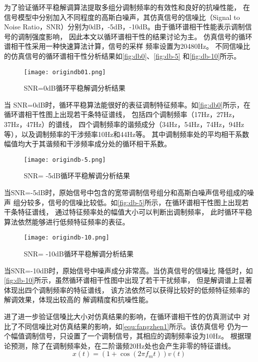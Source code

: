 为了验证循环平稳解调算法提取多组分调制频率的有效性和良好的抗噪性能，
在信号模型中分别加入不同程度的高斯白噪声，其仿真信号的信噪比（Signal to Noise 
Ratio，SNR）分别为0dB，-5dB，-10dB。由于循环谱相干性能表示调制信号的调制强度影响，
因此本文以循环谱相干性的结果讨论为主。
仿真信号的循环谱相干性采用一种快速算法计算，信号的采样
频率设置为20480Hz。
不同信噪比的仿真信号的循环谱相干性分析结果如\autoref{fig:db0}、\autoref{fig:db-5}
和\autoref{fig:db-10}所示。
\begin{figure}[htbp]
    \centering
    \texttt{[image: origindb01.png]}
    \caption{\label{fig:db0}SNR=0dB循环平稳解调分析结果}
\end{figure}

当 SNR=0dB时，循环平稳算法能很好的表征调制特征频率。如\autoref{fig:db0}所示，在循环谱相干性图上出现若干条特征谱线，
包括四个调制频率（17Hz，27Hz，37Hz，47Hz）的谱线，
四个调制频率的谐频成分（34Hz，54Hz，74Hz，94Hz等），以及调制频率的干涉频率10Hz和44Hz等。
其中调制频率处的平均相干系数幅值均大于其谐频和干涉频率成分处的循环相干系数。
\begin{figure}[htbp]
    \centering
    \texttt{[image: origindb-5.png]}
    \caption{\label{fig:db-5}SNR= -5dB循环平稳解调分析结果}
\end{figure}

当SNR=-5dB时，原始信号中包含的宽带调制信号组分和高斯白噪声信号组成的噪声
组分较多，信号的信噪比较低。如\autoref{fig:db-5}所示，在循环谱相干性图上出现若干条特征谱线，
通过特征频率处的幅值大小可以判断出调制频率，
此时循环平稳算法依然能够进行低频特征频率的表征。

\begin{figure}[htbp]
    \centering
    \texttt{[image: origindb-10.png]}
    \caption{\label{fig:db-10}SNR= -10dB循环平稳解调分析结果}
\end{figure}

当SNR=-10dB时，原始信号中噪声成分非常高。当仿真信号的信噪比
降低时，如\autoref{fig:db-10}所示，虽然循环谱相干性图中出现了若干干扰频率，
但是解调谱上显著体现出四个调制频率的特征谱线，
该方法依然可以获得比较好的低频特征频率的解调效果，体现出较高的
解调精度和抗噪性能。

进了进一步验证信嗓比大小对仿真结果的影响，在循环谱相干性的仿真测试中
对比了不同信噪比对仿真结果的影响，如\autoref{equ:fangzhen1}所示。该仿真信号
仍为一个幅值调制信号，只设置了一个调制信号，其相应的调制频率设为10Hz。
根据理论预测，除了在调制频率处，在二阶谐频20Hz处也会产生非零的特征谱线。
\begin{equation}
    \label{equ:fangzhen1}
    x\left ( t \right ) =\left ( 1+\cos \left ( 2\pi f_mt \right )  \right ) v\left ( t \right ) 
\end{equation}

